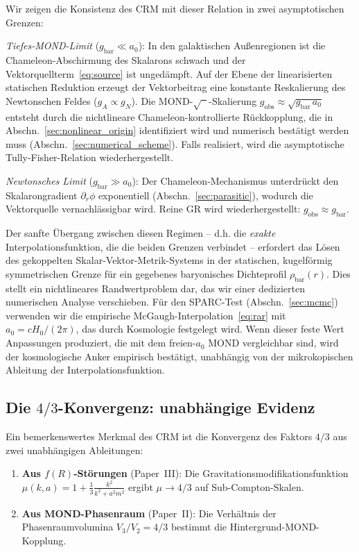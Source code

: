 \documentclass[aps,prd,twocolumn,superscriptaddress,nofootinbib]{revtex4-2}
\begin{document}
Wir zeigen die Konsistenz des CRM mit dieser Relation in zwei asymptotischen Grenzen:

\textit{Tiefes-MOND-Limit} ($g_{\mathrm{bar}} \ll a_0$): In den galaktischen Au\ss{}enregionen ist die Chameleon-Abschirmung des Skalarons schwach und der Vektorquellterm~\eqref{eq:source} ist unged\"ampft. Auf der Ebene der linearisierten statischen Reduktion erzeugt der Vektorbeitrag eine konstante Reskalierung des Newtonschen Feldes ($g_A \propto g_N$). Die MOND-$\sqrt{\phantom{x}}$-Skalierung $g_{\mathrm{obs}} \approx \sqrt{g_{\mathrm{bar}}\,a_0}$ entsteht durch die nichtlineare Chameleon-kontrollierte R\"uckkopplung, die in Abschn.~\ref{sec:nonlinear_origin} identifiziert wird und numerisch best\"atigt werden muss (Abschn.~\ref{sec:numerical_scheme}). Falls realisiert, wird die asymptotische Tully-Fisher-Relation wiederhergestellt.

\textit{Newtonsches Limit} ($g_{\mathrm{bar}} \gg a_0$): Der Chameleon-Mechanismus unterdr\"uckt den Skalarongradient $\partial_r\phi$ exponentiell (Abschn.~\ref{sec:parasitic}), wodurch die Vektorquelle vernachl\"assigbar wird. Reine GR wird wiederhergestellt: $g_{\mathrm{obs}} \approx g_{\mathrm{bar}}$.

Der sanfte \"Ubergang zwischen diesen Regimen -- d.h. die \textit{exakte} Interpolationsfunktion, die die beiden Grenzen verbindet -- erfordert das L\"osen des gekoppelten Skalar-Vektor-Metrik-Systems in der statischen, kugelf\"ormig symmetrischen Grenze f\"ur ein gegebenes baryonisches Dichteprofil $\rho_{\mathrm{bar}}(r)$. Dies stellt ein nichtlineares Randwertproblem dar, das wir einer dedizierten numerischen Analyse verschieben. F\"ur den SPARC-Test (Abschn.~\ref{sec:mcmc}) verwenden wir die empirische McGaugh-Interpolation~\eqref{eq:rar} mit $a_0 = cH_0/(2\pi)$, das durch Kosmologie festgelegt wird. Wenn dieser feste Wert Anpassungen produziert, die mit dem freien-$a_0$ MOND vergleichbar sind, wird der kosmologische Anker empirisch best\"atigt, unabh\"angig von der mikrokopischen Ableitung der Interpolationsfunktion.

\subsection{Die $4/3$-Konvergenz: unabh\"angige Evidenz}
\label{sec:four_thirds}

Ein bemerkenswertes Merkmal des CRM ist die Konvergenz des Faktors $4/3$ aus zwei unabh\"angigen Ableitungen:

\begin{enumerate}
\item \textbf{Aus $f(R)$-St\"orungen} (Paper~III): Die Gravitationsmodifikationsfunktion $\mu(k,a) = 1 + \frac{1}{3}\frac{k^2}{k^2 + a^2 m^2}$ ergibt $\mu \to 4/3$ auf Sub-Compton-Skalen.

\item \textbf{Aus MOND-Phasenraum} (Paper~II): Die Verh\"altnis der Phasenraumvolumina $V_3/V_2 = 4/3$ bestimmt die Hintergrund-MOND-Kopplung.
\end{enumerate}
\end{document}
